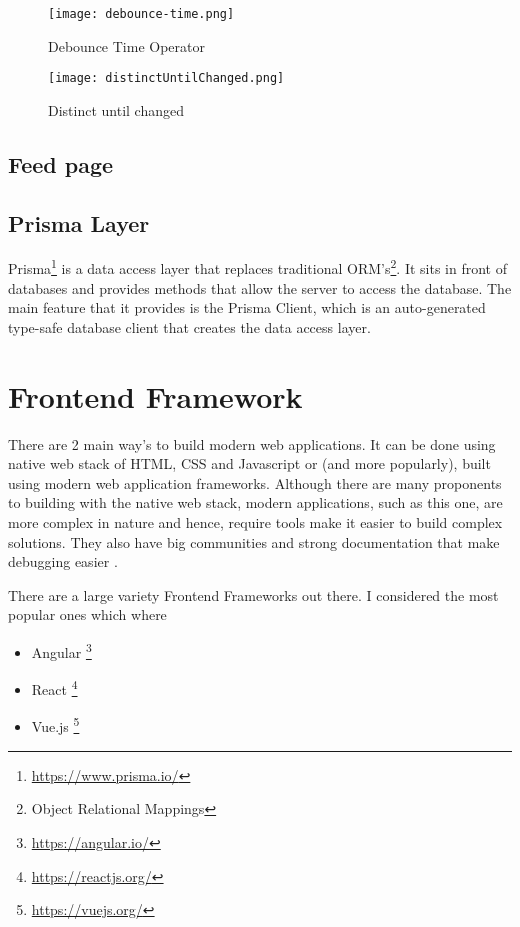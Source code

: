 \begin{figure}[htb!]
    \centering
    \texttt{[image: debounce-time.png]}
    \caption{Debounce Time Operator}
    \label{fig:debounceTime}
\end{figure}

\begin{figure}[htb!]
    \centering
    \texttt{[image: distinctUntilChanged.png]}
    \caption{Distinct until changed}
    \label{fig:distinctUntilChanged}
\end{figure}


\subsection{Feed page}

\subsection{Prisma Layer}
Prisma\footnote{\url{https://www.prisma.io/}} is a data access layer that replaces traditional ORM's\footnote{Object Relational Mappings}. It sits in front of databases and provides methods that allow the server to access the database. The main feature that it provides is the Prisma Client, which is an auto-generated type-safe database client that creates the data access layer.

\section{Frontend Framework} \label{frontendFramework}
There are 2 main way's to build modern web applications. It can be done using native web stack of HTML, CSS and Javascript or (and more popularly), built using modern web application frameworks. Although there are many proponents to building with the native web stack, modern applications, such as this one, are more complex in nature and hence, require tools make it easier to build complex solutions. They also have big communities and strong documentation that make debugging easier \cite{medium:WhyModernJSFrameworkExist}.

There are a large variety Frontend Frameworks out there. I considered the most popular ones which where
\begin{itemize}
    \item Angular \footnote{\url{https://angular.io/}}
    \item React \footnote{\url{https://reactjs.org/}}
    \item Vue.js \footnote{\url{https://vuejs.org/}}
\end{itemize}


